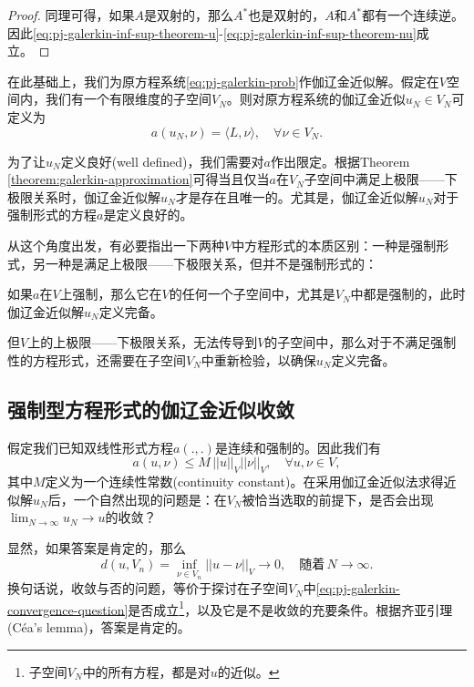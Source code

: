 \begin{subappendices}
\begin{proof}
同理可得，如果$A$是双射的，那么$A^{*}$也是双射的，$A$和$A^{*}$都有一个连续逆。因此\eqref{eq:pj-galerkin-inf-sup-theorem-u}-\eqref{eq:pj-galerkin-inf-sup-theorem-nu}成立。
\end{proof}

在此基础上，我们为原方程系统\eqref{eq:pj-galerkin-prob}作伽辽金近似解。假定在$V$空间内，我们有一个有限维度的子空间$V_N$。则对原方程系统的伽辽金近似$u_N \in V_N$可定义为
\begin{equation}
\label{eq:pj-galerkin-approximation-solution}
a(u_N,\nu) = \langle L, \nu \rangle, \quad \forall \nu \in V_N.
\end{equation}

为了让$u_N$定义良好(well defined)，我们需要对$a$作出限定。根据Theorem \ref{theorem:galerkin-approximation}可得当且仅当$a$在$V_N$子空间中满足上极限——下极限关系时，伽辽金近似解$u_N$才是存在且唯一的。尤其是，伽辽金近似解$u_N$对于强制形式的方程$a$是定义良好的。

从这个角度出发，有必要指出一下两种$V$中方程形式的本质区别：一种是强制形式，另一种是满足上极限——下极限关系，但并不是强制形式的：
\begin{remark}
  \label{remark:pj-galerkin-inf-sup-problem}
  如果$a$在$V$上强制，那么它在$V$的任何一个子空间中，尤其是$V_N$中都是强制的，此时伽辽金近似解$u_N$定义完备。

  但$V$上的上极限——下极限关系，无法传导到$V$的子空间中，那么对于不满足强制性的方程形式，还需要在子空间$V_N$中重新检验，以确保$u_N$定义完备。
\end{remark}


\subsection{强制型方程形式的伽辽金近似收敛}
\label{sec:pj-galerkin-convergence-coercive}
假定我们已知双线性形式方程$a(.,.)$是连续和强制的。因此我们有
\begin{equation}
  \label{eq:pj-galerkin-convergence-M}
  a(u,\nu) \le M  \, ||u||_{V} ||\nu||_{V}, \quad \forall u,\nu \in V,
\end{equation}
其中$M$定义为一个连续性常数(continuity constant)。在采用伽辽金近似法求得近似解$u_N$后，一个自然出现的问题是：在$V_N$被恰当选取的前提下，是否会出现$\lim_{N \rightarrow \infty} u_N \rightarrow u$的收敛？

显然，如果答案是肯定的，那么
\begin{equation}
  \label{eq:pj-galerkin-convergence-question}
  d(u,V_n) = \inf_{\nu \in V_n} || u - \nu ||_{V} \rightarrow 0, \quad \text{随着} \, N \rightarrow \infty.
\end{equation}
换句话说，收敛与否的问题，等价于探讨在子空间$V_{N}$中\eqref{eq:pj-galerkin-convergence-question}是否成立\footnote{子空间$V_N$中的所有方程，都是对$u$的近似。}，以及它是不是收敛的充要条件。根据齐亚引理(Céa's lemma)，答案是肯定的。


\end{subappendices}
